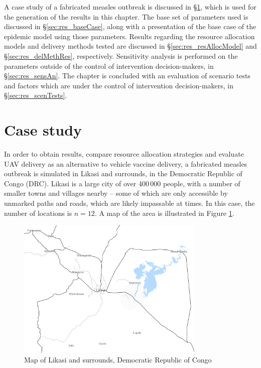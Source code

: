 A case study of a fabricated measles outbreak is discussed in \S \ref{sec:res_caseS}, which is used for the generation of the results in this chapter. The base set of parameters used is discussed in \S \ref{sec:res_baseCase}, along with a presentation of the base case of the epidemic model using those parameters. Results regarding the resource allocation models and delivery methods tested are discussed in \S \ref{sec:res_resAllocModel} and \S \ref{sec:res_delMethRes}, respectively. Sensitivity analysis is performed on the parameters outside of the control of intervention decision-makers, in \S \ref{sec:res_sensAn}. The chapter is concluded with an evaluation of scenario tests and factors which are under the control of intervention decision-makers, in \S \ref{sec:res_scenTests}.

\section{Case study}
\label{sec:res_caseS}
In order to obtain results, compare resource allocation strategies and evaluate UAV delivery as an alternative to vehicle vaccine delivery, a fabricated measles outbreak is simulated in Likasi and surrounds, in the Democratic Republic of Congo (DRC). Likasi is a large city of over 400\,000 people, with a number of smaller towns and villages nearby -- some of which are only accessible by unmarked paths and roads, which are likely impassable at times. In this case, the number of locations is $n = 12.$ A map of the area is illustrated in Figure \ref{map:likasi}.

\begin{figure}[ht!]{\textwidth}
    \centering
    \includegraphics[width=0.8\textwidth]{likasi.png}
    \caption{Map of Likasi and surrounds, Democratic Republic of Congo}
    \label{map:likasi}
\end{figure}

